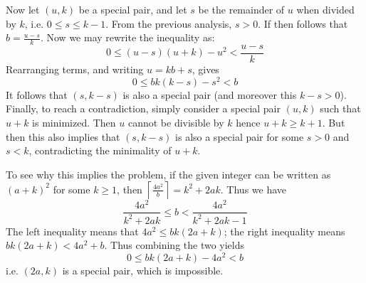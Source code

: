 \documentclass[11pt,a4paper]{article}
\begin{document}
\begin{enumerate}
	Now let $(u, k)$ be a special pair, and let $s$ be the remainder of $u$ when divided by $k$, i.e. $0\le s\le k - 1$. 
	From the previous analysis, $s > 0$. 
	If then follows that $b = \frac{u - s}{k}$. 
	Now we may rewrite the inequality as: 
	\[
	0\le (u - s)(u + k) - u^2 < \frac{u - s}{k}
	\]
	Rearranging terms, and writing $u = kb + s$, gives 
	\[
	0\le bk(k - s) - s^2 < b
	\]
	It follows that $(s, k - s)$ is also a special pair (and moreover this $k - s > 0$). 
	Finally, to reach a contradiction, simply consider a special pair $(u, k)$ such that $u + k$ is minimized. 
	Then $u$ cannot be divisible by $k$ hence $u + k \ge k + 1$. 
	But then this also implies that $(s, k - s)$ is also a special pair for some $s > 0$ and $s < k$, 
	contradicting the minimality of $u + k$. 
	
	To see why this implies the problem, if the given integer can be written as $(a + k)^2$ for some $k\ge 1$, 
	then $\left\lceil\frac{4a^2}b\right\rceil = k^2 + 2ak$. Thus we have 
	\[
	\frac{4a^2}{k^2+2ak} \le b < \frac{4a^2}{k^2+2ak - 1}
	\]
	The left inequality means that $4a^2\le bk(2a + k)$; the right inequality means 
	$bk(2a+k)< 4a^2 + b$. Thus combining the two yields 
	\[
	0\le bk(2a + k) - 4a^2 < b
	\]
	i.e. $(2a, k)$ is a special pair, which is impossible. 
	
\end{enumerate}
\end{document}
